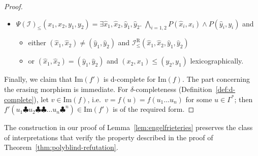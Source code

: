 \documentclass{fundam}
\newcommand{\Image}{\mathrm{Im}}
\newcommand{\cI}{\mathcal{I}}
\newcommand{\relat}{\mathrm{R}}
\theoremstyle{claimstyle}
\begin{document}
\begin{proof}
\begin{itemize}
    \item $\Psi(\cI)_\leq(x_1,x_2,y_1,y_2) = \exists \widehat{x}_1,\widehat{x}_2,\widehat{y}_1,\widehat{y}_2.\; \displaystyle\bigwedge_{i=1,2} P(\widehat{x}_i,x_i) \land P(\widehat{y}_i,y_i)$ and
    \begin{itemize}
    \item either $(\widehat{x}_1,\widehat{x}_2) \neq (\widehat{y}_1,\widehat{y}_2)$ and $\cI_\leq^\relat(\widehat{x}_1,\widehat{x}_2,\widehat{y}_1,\widehat{y}_2)$
      \item or $(\widehat{x}_1,\widehat{x}_2) = (\widehat{y}_1,\widehat{y}_2)$ and $(x_2,x_1) \leq (y_2,y_1)$ lexicographically.
    \end{itemize}
  \end{itemize}
  Finally, we claim that $\Image(f')$ is d-complete for $\Image(f)$.
  The part concerning the erasing morphism is immediate.
  For $\delta$-completeness (Definition~\ref{def:d-complete}), let $v\in\Image(f)$, i.e.\ $v = f(u) = f(u_1 \dots u_n)$ for some $u\in\Gamma^*$; then $f'(u_1\clubsuit u_2 \clubsuit\clubsuit \dots u_n\clubsuit^n) \in \Image(f')$ is of the required form.
\end{proof}


\begin{remark}
  The construction in our proof of Lemma~\ref{lem:engelfrieteries} preserves the class of interpretations that verify the property described in the proof of Theorem~\ref{thm:polyblind-refutation}.
\end{remark}




\end{document}
